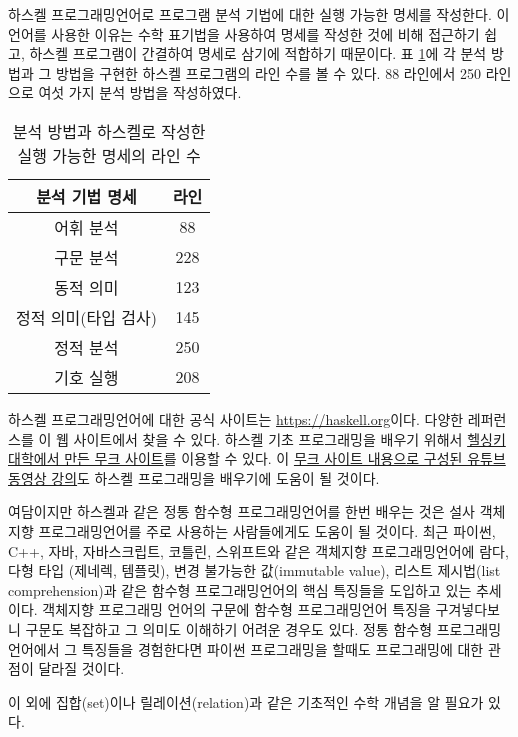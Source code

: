 \documentclass[a4paper]{book}
\begin{document}
하스켈 프로그래밍언어로 프로그램 분석 기법에 대한 실행 가능한 명세를
작성한다. 이 언어를 사용한 이유는 수학 표기법을 사용하여 명세를 작성한
것에 비해 접근하기 쉽고, 하스켈 프로그램이 간결하여 명세로 삼기에
적합하기 때문이다. 표 \ref{table:lines}에 각 분석 방법과 그 방법을
구현한 하스켈 프로그램의 라인 수를 볼 수 있다. 88 라인에서 250
라인으로 여섯 가지 분석 방법을 작성하였다.

\begin{table}[ht]
\begin{center}
  \begin{tabular}{|c|c|}\hline
    분석 기법 명세 & 라인 \\\hline\hline
    어휘 분석 & 88 \\\hline
    구문 분석 & 228 \\\hline
    동적 의미 & 123 \\\hline
    정적 의미(타입 검사) & 145 \\\hline
    정적 분석 & 250 \\\hline
    기호 실행 & 208 \\\hline
  \end{tabular}
\end{center}
\caption{분석 방법과 하스켈로 작성한 실행 가능한 명세의 라인 수}
\label{table:lines}
\end{table}

하스켈 프로그래밍언어에 대한 공식 사이트는
\href{https://haskell.org}{https://haskell.org}이다. 다양한 레퍼런스를
이 웹 사이트에서 찾을 수 있다. 하스켈 기초 프로그래밍을 배우기 위해서
\href{https://haskell.mooc.fi/}{헬싱키 대학에서 만든 무크 사이트}를
이용할 수 있다. 이
\href{https://www.youtube.com/playlist?list=PLhbaMvGyp99_NphAX7k5OqcM1fXLZne8t}{무크
  사이트 내용으로 구성된 유튜브 동영상 강의}도 하스켈 프로그래밍을
배우기에 도움이 될 것이다.

여담이지만 하스켈과 같은 정통 함수형 프로그래밍언어를 한번 배우는 것은
설사 객체지향 프로그래밍언어를 주로 사용하는 사람들에게도 도움이 될
것이다.  최근 파이썬, C++, 자바, 자바스크립트, 코틀린, 스위프트와 같은
객체지향 프로그래밍언어에 람다, 다형 타입 (제네렉, 템플릿), 변경
불가능한 값(immutable value), 리스트 제시법(list comprehension)과 같은
함수형 프로그래밍언어의 핵심 특징들을 도입하고 있는 추세이다. 객체지향
프로그래밍 언어의 구문에 함수형 프로그래밍언어 특징을 구겨넣다보니
구문도 복잡하고 그 의미도 이해하기 어려운 경우도 있다.  정통 함수형
프로그래밍언어에서 그 특징들을 경험한다면 파이썬 프로그래밍을 할때도
프로그래밍에 대한 관점이 달라질 것이다.

이 외에 집합(set)이나 릴레이션(relation)과 같은 기초적인 수학 개념을
알 필요가 있다.
\end{document}
